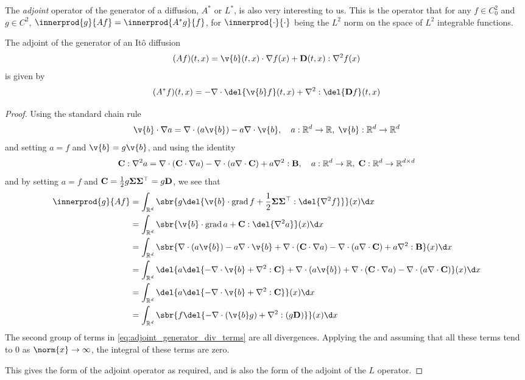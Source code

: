 The \emph{adjoint} operator of the generator of a diffusion, \(A^*\) or \(L^*\), is also very interesting to us.
This is the operator that for any \(f\in C_0^2\) and \(g\in C^2\), \(\innerprod{g}{Af} = \innerprod{A^*g}{f}\), for \(\innerprod{\cdot}{\cdot}\) being the \(L^2\) norm on the space of \(L^2\) integrable functions.
\begin{theorem}
	The adjoint of the generator of an {I}t\^o diffusion
	\[(Af)(t, x) = \v{b}(t, x) \cdot \nabla f(x) + \m{D}(t, x) : \nabla^2 f(x)	\]
	is given by 
	\[(A^*f)(t, x) = -\nabla\cdot\del{\v{b} f}(t, x) + \nabla^2 :\del{\m{D}f}(t, x)\]
\end{theorem}
\begin{proof}
	Using the standard chain rule
	\[ \v{b} \cdot \nabla a= \nabla\cdot(a\v{b}) - a \nabla \cdot \v{b}, \quad a:\R^d \to \R, \; \v{b}: \R^d\to \R^d\]
	and setting \(a=f\) and \(\v{b} = g\v{b}\), and using the identity
	\[\m{C}:\nabla^2 a = \nabla \cdot (\m{C} \cdot \nabla a) - \nabla \cdot (a \nabla \cdot \m{C}) + a\nabla^2:\m{B}, \quad a:\R^d\to \R, \; \m{C}:\R^d \to \R^{d\times d}\]
	and by setting \(a = f\) and \(\m{C} =  \frac{1}{2} g \m{\Sigma}\m{\Sigma}^\top = g\m{D}\), we see that
	\begin{align}
		\innerprod{g}{Af} &= \int_{\R^d} \sbr{g \del{\v{b}\cdot \grad f + \frac{1}{2}{\m{\Sigma}\m{\Sigma}^\top:\del{\nabla^2f}}}}(x) \d x \\
		&= \int_{\R^d} \sbr{{\v{b}\cdot \grad a + {\m{C}:\del{\nabla^2a}}}}(x) \d x\\
		&= \int_{\R^d} \sbr{\nabla\cdot(a\v{b}) - a \nabla \cdot \v{b} +  \nabla \cdot (\m{C} \cdot \nabla a) - \nabla \cdot (a \nabla \cdot \m{C}) + a\nabla^2:\m{B}}(x)\d x \\
		&=\int_{\R^d} \del{a\del{-\nabla\cdot \v{b} + \nabla^2:\m{C}} + \nabla\cdot(a\v{b}) + \nabla \cdot (\m{C} \cdot \nabla a) - \nabla \cdot (a \nabla \cdot \m{C})}(x) \d x \label{eq:adjoint_generator_div_terms}\\
		&=\int_{\R^d} \del{a\del{-\nabla\cdot \v{b} + \nabla^2:\m{C}}}(x) \d x\\
		&=\int_{\R^d} \sbr{f \del{-\nabla \cdot (\v{b}g) + \nabla^2:(g \m{D})}}(x) \d x
	\end{align}
	The second group of terms in \cref{eq:adjoint_generator_div_terms} are all divergences.
	Applying the  and assuming that all these terms tend to \(0\) as \(\norm{x} \to \infty\), the integral of these terms are zero.

	This gives the form of the adjoint operator as required, and is also the form of the adjoint of the \(L\) operator.
\end{proof}

